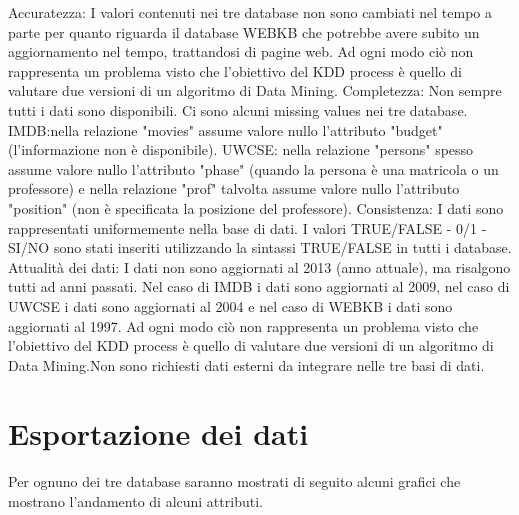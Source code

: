 Accuratezza: I valori contenuti nei tre database non sono cambiati nel tempo a parte per quanto riguarda il database WEBKB che potrebbe avere subito un aggiornamento nel tempo, trattandosi di pagine web. Ad ogni modo ciò non rappresenta un problema visto che l'obiettivo del KDD process è quello di valutare due versioni di un algoritmo di Data Mining.
Completezza: Non sempre tutti i dati sono disponibili. Ci sono alcuni missing values nei tre database.
IMDB:nella relazione "movies" assume valore nullo l'attributo "budget" (l'informazione non è disponibile).
UWCSE: nella relazione "persons" spesso assume valore nullo l'attributo "phase" (quando la persona è una matricola o un professore) e nella relazione "prof" talvolta assume valore nullo l'attributo "position" (non è specificata la posizione del professore). 
Consistenza: I dati sono rappresentati uniformemente nella base di dati. I valori TRUE/FALSE - 0/1 - SI/NO sono stati inseriti utilizzando la sintassi TRUE/FALSE in tutti i database. 
Attualità dei dati: I dati non sono aggiornati al 2013 (anno attuale), ma risalgono tutti ad anni passati. 
Nel caso di IMDB i dati sono aggiornati al 2009, nel caso di UWCSE i dati sono aggiornati al 2004 e nel caso di WEBKB i dati sono aggiornati al 1997. Ad ogni modo ciò non rappresenta un problema visto che l’obiettivo del KDD process è quello di valutare due versioni di un algoritmo di Data Mining.Non sono richiesti dati esterni da integrare nelle tre basi di dati.

\section{Esportazione dei dati}
Per ognuno dei tre database saranno mostrati di seguito alcuni grafici che mostrano l’andamento di alcuni attributi.


